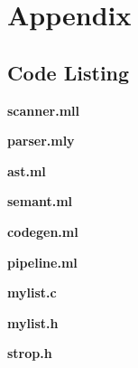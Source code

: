 \documentclass[./Report_main.tex]{subfiles}
\begin{document}


\chapter{Appendix}
\section*{Code Listing}
\textbf{scanner.mll}

\textbf{parser.mly}

\textbf{ast.ml}

\textbf{semant.ml}

\textbf{codegen.ml}

\textbf{pipeline.ml}

\textbf{mylist.c}

\textbf{mylist.h}

\textbf{strop.h}

\end{document}
